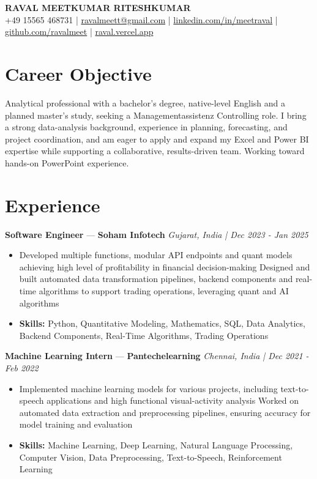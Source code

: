 \documentclass[a4paper,10pt]{article}
\begin{document}
\begin{center}
  {\Large\bfseries RAVAL MEETKUMAR RITESHKUMAR}\\[2pt]
  {\small +49 15565 468731 \;|\; \href{mailto:ravalmeett@gmail.com}{ravalmeett@gmail.com} \;|\; \href{https://www.linkedin.com/in/meetraval/}{linkedin.com/in/meetraval} \;|\; \href{https://github.com/ravalmeet}{github.com/ravalmeet} \;|\; \href{https://raval.vercel.app/}{raval.vercel.app}}
\end{center}
\vspace{-3pt}

\section*{Career Objective}
Analytical professional with a bachelor's degree, native-level English and a planned master's study, seeking a Managementassistenz Controlling role. I bring a strong data-analysis background, experience in planning, forecasting, and project coordination, and am eager to apply and expand my Excel and Power BI expertise while supporting a collaborative, results-driven team. Working toward hands-on PowerPoint experience.\par

\section*{Experience}
\textbf{Software Engineer} — \textbf{Soham Infotech} \hfill \textit{Gujarat, India \;|\; Dec 2023 - Jan 2025}\par
\vspace{1pt}
\begin{itemize}
  \item Developed multiple functions, modular API endpoints and quant models achieving high level of profitability in financial decision-making Designed and built automated data transformation pipelines, backend components and real-time algorithms to support trading operations, leveraging quant and AI algorithms
  \item \textbf{Skills:} Python, Quantitative Modeling, Mathematics, SQL, Data Analytics, Backend Components, Real-Time Algorithms, Trading Operations
\end{itemize}
\vspace{3pt}
\textbf{Machine Learning Intern} — \textbf{Pantechelearning} \hfill \textit{Chennai, India \;|\; Dec 2021 - Feb 2022}\par
\vspace{1pt}
\begin{itemize}
  \item Implemented machine learning models for various projects, including text-to-speech applications and high functional visual-activity analysis Worked on automated data extraction and preprocessing pipelines, ensuring accuracy for model training and evaluation
  \item \textbf{Skills:} Machine Learning, Deep Learning, Natural Language Processing, Computer Vision, Data Preprocessing, Text-to-Speech, Reinforcement Learning
\end{itemize}
\end{document}
